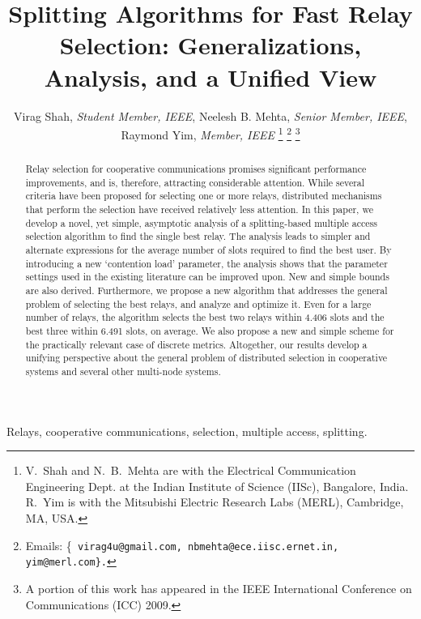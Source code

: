 \documentclass[12pt,draftcls,peerreview, onecolumn]{IEEEtran}
\begin{document}
\title{Splitting Algorithms for Fast Relay Selection: Generalizations, Analysis, and a Unified View}

\author{Virag Shah, {\it Student Member, IEEE}, Neelesh B.  Mehta, {\it Senior Member, IEEE}, Raymond Yim, {\it Member, IEEE}
\thanks{V.\ Shah and N.\ B.\ Mehta are with the Electrical
    Communication Engineering Dept. at the Indian Institute of Science
    (IISc), Bangalore, India.  R.\ Yim is with the Mitsubishi Electric
    Research Labs (MERL), Cambridge, MA, USA.}
\thanks{Emails: \{\tt
    virag4u@gmail.com, nbmehta@ece.iisc.ernet.in, yim@merl.com\}.}
\thanks{A portion of this work has appeared in the IEEE International Conference on Communications (ICC) 2009.} 
}


 \maketitle

\begin{abstract}
  
  Relay selection for cooperative communications promises significant
  performance improvements, and is, therefore, attracting considerable
  attention. While several criteria have been proposed for selecting
  one or more relays, distributed mechanisms that perform the
  selection have received relatively less attention. In this paper, we
  develop a novel, yet simple, asymptotic analysis of a
  splitting-based multiple access selection algorithm to find the
  single best relay. The analysis leads to simpler and alternate
  expressions for the average number of slots required to find the
  best user. By introducing a new `contention load' parameter, the
  analysis shows that the parameter settings used in the existing
  literature can be improved upon. New and simple bounds are also
  derived. Furthermore, we propose a new algorithm that addresses the
  general problem of selecting the best  relays, and analyze
  and optimize it.  Even for a large number of relays, the algorithm
  selects the best two relays within 4.406 slots and the best three
  within 6.491 slots, on average. We also propose a new and simple
  scheme for the practically relevant case of discrete metrics.
  Altogether, our results develop a unifying perspective about the
  general problem of distributed selection in cooperative systems and
  several other multi-node systems.
\end{abstract}

\begin{keywords}
Relays, cooperative communications, selection, multiple access, splitting.
\end{keywords}
\end{document}
